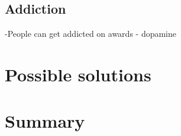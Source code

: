 \documentclass[10pt,twoside,english,a4paper]{article}
\begin{document}
\subsection{Addiction} \label {addiction}
-People can get addicted on awards - dopamine

%
%
%

\section{Possible solutions} \label{solutions}

%
%
%

\section{Summary} \label{summary} %

%
%
%









\end{document}
